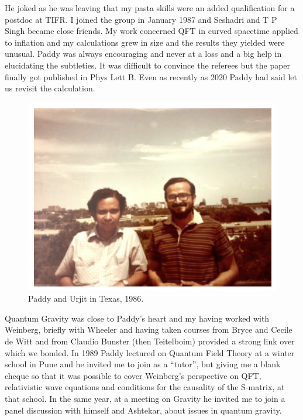 \documentclass[prd, preprint, longbibliography, 11pt]{revtex4-1}
\begin{document}
He joked as he was leaving that my pasta skills were an added qualification for a postdoc at TIFR. I joined the group in January 1987 and Seshadri and T P Singh became close friends. My work concerned QFT in curved spacetime applied to inflation and my calculations grew in size and the results they yielded were unusual. Paddy was always encouraging and never at a loss and a big help in elucidating the subtleties. It was difficult to convince the referees but the paper finally got published in Phys Lett B. Even as recently as 2020 Paddy had said let us revisit the calculation.
\begin{figure}[!h]
\centering
\includegraphics[width=12.00cm]{urjittexa.png}
\caption*{Paddy and Urjit in Texas, 1986.} 
\end{figure}
Quantum Gravity was close to Paddy’s heart and my having worked with Weinberg, briefly with Wheeler and having taken courses from Bryce and Cecile de Witt and from Claudio Bunster (then Teitelboim) provided a strong link over which we bonded.  In 1989 Paddy lectured on Quantum Field Theory at a winter school in Pune and he invited me to join as a “tutor”, but giving me a blank cheque so that it was possible to cover Weinberg’s perspective on QFT, relativistic wave equations and conditions for the causality of the S-matrix, at that school.  In the same year, at a meeting on Gravity he invited me to join a panel discussion with himself and Ashtekar, about issues in quantum gravity.  
\end{document}
